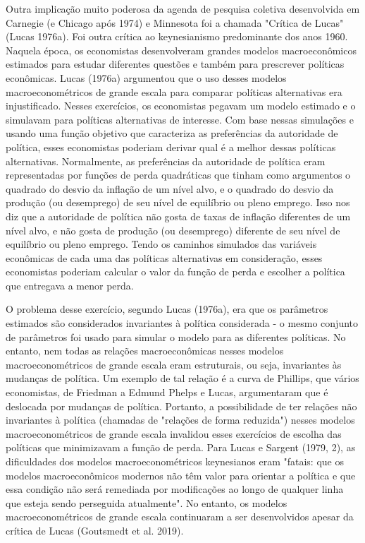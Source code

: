 \documentclass[a4paper,12pt]{article}[abntex2]
\begin{document}
Outra implicação muito poderosa da agenda de pesquisa coletiva desenvolvida em Carnegie (e Chicago após 1974) e Minnesota foi a chamada "Crítica de Lucas" (Lucas 1976a). Foi outra crítica ao keynesianismo predominante dos anos 1960. Naquela época, os economistas desenvolveram grandes modelos macroeconômicos estimados para estudar diferentes questões e também para prescrever políticas econômicas. Lucas (1976a) argumentou que o uso desses modelos macroeconométricos de grande escala para comparar políticas alternativas era injustificado. Nesses exercícios, os economistas pegavam um modelo estimado e o simulavam para políticas alternativas de interesse. Com base nessas simulações e usando uma função objetivo que caracteriza as preferências da autoridade de política, esses economistas poderiam derivar qual é a melhor dessas políticas alternativas. Normalmente, as preferências da autoridade de política eram representadas por funções de perda quadráticas que tinham como argumentos o quadrado do desvio da inflação de um nível alvo, e o quadrado do desvio da produção (ou desemprego) de seu nível de equilíbrio ou pleno emprego. Isso nos diz que a autoridade de política não gosta de taxas de inflação diferentes de um nível alvo, e não gosta de produção (ou desemprego) diferente de seu nível de equilíbrio ou pleno emprego. Tendo os caminhos simulados das variáveis econômicas de cada uma das políticas alternativas em consideração, esses economistas poderiam calcular o valor da função de perda e escolher a política que entregava a menor perda.

O problema desse exercício, segundo Lucas (1976a), era que os parâmetros estimados são considerados invariantes à política considerada - o mesmo conjunto de parâmetros foi usado para simular o modelo para as diferentes políticas. No entanto, nem todas as relações macroeconômicas nesses modelos macroeconométricos de grande escala eram estruturais, ou seja, invariantes às mudanças de política. Um exemplo de tal relação é a curva de Phillips, que vários economistas, de Friedman a Edmund Phelps e Lucas, argumentaram que é deslocada por mudanças de política. Portanto, a possibilidade de ter relações não invariantes à política (chamadas de "relações de forma reduzida") nesses modelos macroeconométricos de grande escala invalidou esses exercícios de escolha das políticas que minimizavam a função de perda. Para Lucas e Sargent (1979, 2), as dificuldades dos modelos macroeconométricos keynesianos eram "fatais: que os modelos macroeconômicos modernos não têm valor para orientar a política e que essa condição não será remediada por modificações ao longo de qualquer linha que esteja sendo perseguida atualmente". No entanto, os modelos macroeconométricos de grande escala continuaram a ser desenvolvidos apesar da crítica de Lucas (Goutsmedt et al. 2019).
\end{document}
